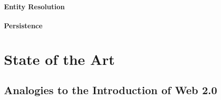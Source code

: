 	\subsubsection*{Entity Resolution}	

	\subsubsection*{Persistence}

%	










\chapter{State of the Art}
\label{stateofzart}









\section{Analogies to the Introduction of Web 2.0}

